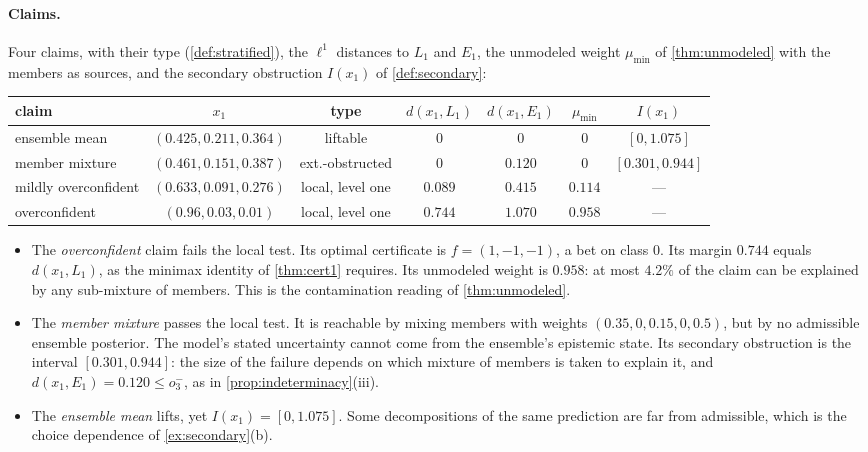 \documentclass[11pt]{article}
\theoremstyle{definition}
\theoremstyle{remark}
\begin{document}
\paragraph{Claims.} Four claims, with their type (\cref{def:stratified}), the $\ell^1$ distances to $L_1$ and $E_1$, the
unmodeled weight $\mu_{\min}$ of \cref{thm:unmodeled} with the members as sources, and the secondary obstruction
$I(x_1)$ of \cref{def:secondary}:
\begin{center}\small
\setlength{\tabcolsep}{4pt}
\begin{tabular}{@{}lcccccc@{}}
\toprule
claim & $x_1$ & type & $d(x_1,L_1)$ & $d(x_1,E_1)$ & $\mu_{\min}$ & $I(x_1)$\\
\midrule
ensemble mean & $(0.425,0.211,0.364)$ & liftable & $0$ & $0$ & $0$ & $[0,1.075]$\\
member mixture & $(0.461,0.151,0.387)$ & ext.-obstructed & $0$ & $0.120$ & $0$ & $[0.301,0.944]$\\
mildly overconfident & $(0.633,0.091,0.276)$ & local, level one & $0.089$ & $0.415$ & $0.114$ & ---\\
overconfident & $(0.96,0.03,0.01)$ & local, level one & $0.744$ & $1.070$ & $0.958$ & ---\\
\bottomrule
\end{tabular}
\end{center}
\begin{itemize}[leftmargin=*]
\item The \emph{overconfident} claim fails the local test. Its optimal certificate is $f=(1,-1,-1)$, a bet on class $0$.
  Its margin $0.744$ equals $d(x_1,L_1)$, as the minimax identity of \cref{thm:cert1} requires. Its unmodeled weight is
  $0.958$: at most $4.2\%$ of the claim can be explained by any sub-mixture of members. This is the contamination reading
  of \cref{thm:unmodeled}.
\item The \emph{member mixture} passes the local test. It is reachable by mixing members with weights $(0.35,0,0.15,0,0.5)$,
  but by no admissible ensemble posterior. The model's stated uncertainty cannot come from the ensemble's epistemic state.
  Its secondary obstruction is the interval $[0.301,0.944]$: the size of the failure depends on which mixture of members
  is taken to explain it, and $d(x_1,E_1)=0.120\le o_3^-$, as in \cref{prop:indeterminacy}(iii).
\item The \emph{ensemble mean} lifts, yet $I(x_1)=[0,1.075]$. Some decompositions of the same prediction are far from
  admissible, which is the choice dependence of \cref{ex:secondary}(b).
\end{itemize}
\end{document}
